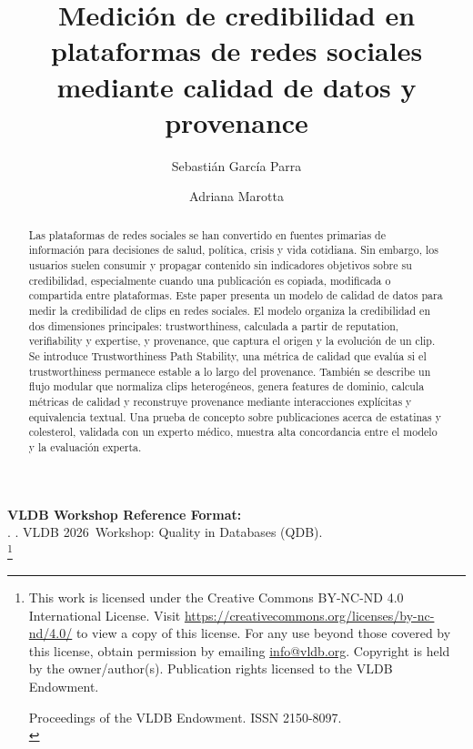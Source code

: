 \documentclass[sigconf, nonacm]{acmart}
\newcommand\vldbyear{2026}
\newcommand\vldbworkshop{Quality in Databases (QDB)}
\newcommand\vldbauthors{\authors}
\newcommand\vldbtitle{\shorttitle}
\newcommand\vldbpagestyle{plain}
\begin{document}
\title[Medici\'on de credibilidad en redes sociales]{Medici\'on de credibilidad en plataformas de redes sociales mediante calidad de datos y provenance}

\author{Sebasti\'an Garc\'ia Parra}

\author{Adriana Marotta}

\begin{abstract}
Las plataformas de redes sociales se han convertido en fuentes primarias de
informaci\'on para decisiones de salud, pol\'itica, crisis y vida cotidiana. Sin
embargo, los usuarios suelen consumir y propagar contenido sin indicadores
objetivos sobre su credibilidad, especialmente cuando una publicaci\'on es copiada,
modificada o compartida entre plataformas. Este paper presenta un modelo de
calidad de datos para medir la credibilidad de clips en redes sociales. El modelo
organiza la credibilidad en dos dimensiones principales: trustworthiness, calculada
a partir de reputation, verifiability y expertise, y provenance, que captura el
origen y la evoluci\'on de un clip. Se introduce Trustworthiness Path Stability,
una m\'etrica de calidad que eval\'ua si el trustworthiness permanece estable a lo
largo del provenance. Tambi\'en se describe un flujo modular que normaliza clips
heterog\'eneos, genera features de dominio, calcula m\'etricas de calidad y
reconstruye provenance mediante interacciones expl\'icitas y equivalencia textual.
Una prueba de concepto sobre publicaciones acerca de estatinas y colesterol,
validada con un experto m\'edico, muestra alta concordancia entre el modelo y la
evaluaci\'on experta.
\end{abstract}

\maketitle

\pagestyle{\vldbpagestyle}
\begingroup\small\noindent\raggedright\textbf{VLDB Workshop Reference Format:}\\
\vldbauthors. \vldbtitle. VLDB \vldbyear\ Workshop: \vldbworkshop.\\
\endgroup
\begingroup
\renewcommand\thefootnote{}\footnote{\noindent
This work is licensed under the Creative Commons BY-NC-ND 4.0 International License. Visit \url{https://creativecommons.org/licenses/by-nc-nd/4.0/} to view a copy of this license. For any use beyond those covered by this license, obtain permission by emailing \href{mailto:info@vldb.org}{info@vldb.org}. Copyright is held by the owner/author(s). Publication rights licensed to the VLDB Endowment. \\
\raggedright Proceedings of the VLDB Endowment.
ISSN 2150-8097. \\
}\addtocounter{footnote}{-1}\endgroup
\end{document}
